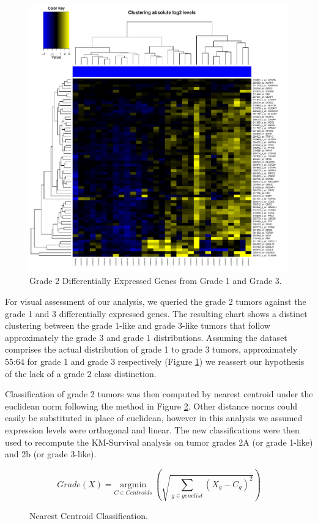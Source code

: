 \documentclass[a4paper,10pt]{article}
\begin{document}
\begin{figure}
\centering
\includegraphics[scale=0.33]{docs/grade2onupregulated3}
\caption{Grade 2 Differentially Expressed Genes from Grade 1 and Grade 3.}\label{grade2up}
\end{figure}
For visual assessment of our analysis, we queried the grade 2 tumors against the grade 1 and 3 differentially expressed genes. The resulting chart
shows a distinct clustering between the grade 1-like and grade 3-like tumors that follow approximately 
the grade 3 and grade 1 distributions. Assuming the dataset comprises the actual distribution 
of grade 1 to grade 3 tumors, approximately 55:64 for grade 1 and grade 3 respectively (Figure \ref{grade2up}) we reassert our hypothesis
of the lack of a grade 2 class distinction.

Classification of grade 2 tumors was then computed by nearest centroid under the euclidean norm following the method in Figure \ref{classify}.
Other distance norms could easily be substituted in place of euclidean, however in this analysis we assumed expression levels were orthogonal
and linear. The new classifications were then used to recompute the KM-Survival analysis on tumor grades 2A (or grade 1-like) and 2b (or grade 3-like).
\begin{figure}
 $$
Grade(X) = \underset{C \in Centroids} {\mathrm{argmin}} ~ \left( \sqrt{\sum_{g\in genelist}{ (X_{g} - C_{g})^2}}\right)
$$
\caption{Nearest Centroid Classification.}\label{classify}
\end{figure}
\end{document}
